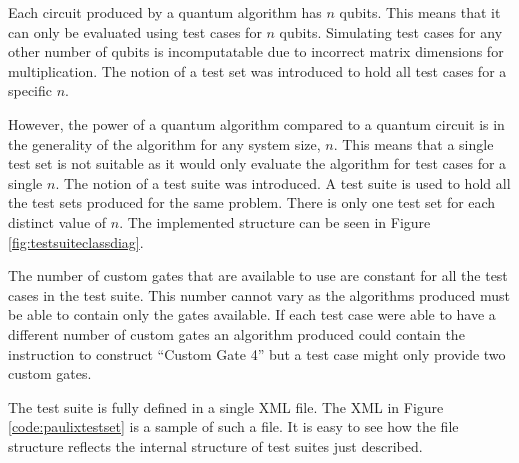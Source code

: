 Each circuit produced by a quantum algorithm has $n$ qubits.
This means that it can only be evaluated using test cases for $n$ qubits.
Simulating test cases for any other number of qubits is incomputatable due to incorrect matrix dimensions for multiplication.
The notion of a test set was introduced to hold all test cases for a specific $n$.

However, the power of a quantum algorithm compared to a quantum circuit is in the generality of the algorithm for any system size, $n$.
This means that a single test set is not suitable as it would only evaluate the algorithm for test cases for a single $n$.
The notion of a test suite was introduced.
A test suite is used to hold all the test sets produced for the same problem.
There is only one test set for each distinct value of $n$.
The implemented structure can be seen in Figure \ref{fig:testsuiteclassdiag}.

The number of custom gates that are available to use are constant for all the test cases in the test suite.
This number cannot vary as the algorithms produced must be able to contain only the gates available.
If each test case were able to have a different number of custom gates an algorithm produced could contain the instruction to construct ``Custom Gate 4'' but a test case might only provide two custom gates.

The test suite is fully defined in a single XML file.
The XML in Figure \ref{code:paulixtestset} is a sample of such a file.
It is easy to see how the file structure reflects the internal structure of test suites just described.

